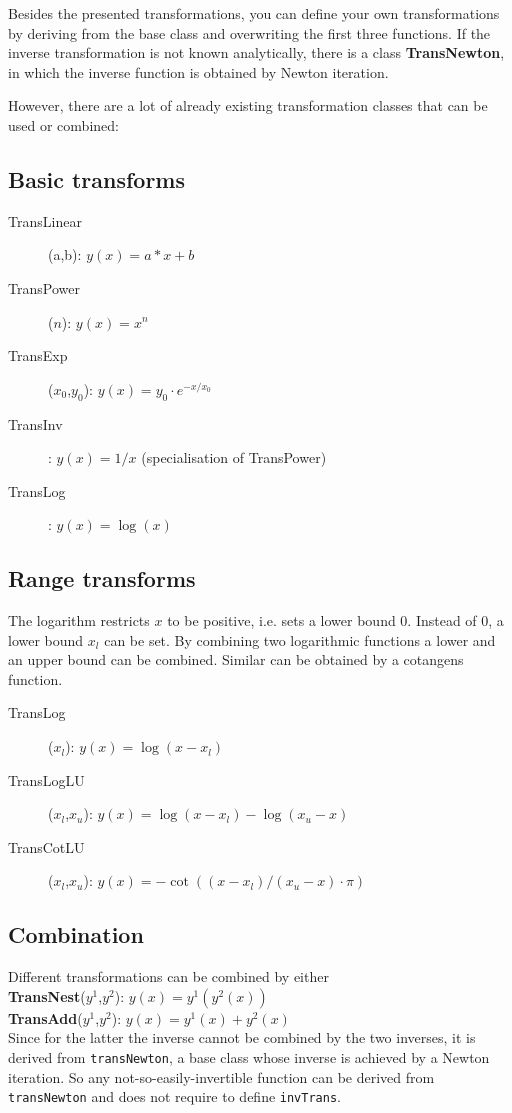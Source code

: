 Besides the presented transformations, you can define your own transformations by deriving from the base class and overwriting the first three functions.
If the inverse transformation is not known analytically, there is a class \textbf{TransNewton}, in which the inverse function is obtained by Newton iteration.

However, there are a lot of already existing transformation classes that can be used or combined:

\subsection*{Basic transforms}
\begin{description}
\item[TransLinear](a,b): $y(x)=a*x+b$
\item[TransPower]($n$): $y(x)=x^n$
\item[TransExp]($x_0$,$y_0$): $y(x)=y_0\cdot e^{-x/x_0}$
\item[TransInv]: $y(x)=1/x$ (specialisation of TransPower)
\item[TransLog]: $y(x)=\log(x)$
\end{description}

\subsection*{Range transforms}
The logarithm restricts $x$ to be positive, i.e. sets a lower bound 0.
Instead of 0, a lower bound $x_l$ can be set.
By combining two logarithmic functions a lower and an upper bound can be combined.
Similar can be obtained by a cotangens function.

\begin{description}
\item[TransLog]($x_l$): $y(x)=\log(x-x_l)$
\item[TransLogLU]($x_l$,$x_u$): $y(x)=\log(x-x_l)-\log(x_u-x)$
\item[TransCotLU]($x_l$,$x_u$): $y(x)=-\cot((x-x_l)/(x_u-x)\cdot\pi)$
\end{description}

\subsection*{Combination}
Different transformations can be combined by either\\
\textbf{TransNest}($y^1$,$y^2$): $y(x)=y^1(y^2(x))$\\
\textbf{TransAdd}($y^1$,$y^2$): $y(x)=y^1(x)+y^2(x)$\\
Since for the latter the inverse cannot be combined by the two inverses, it is derived from \lstinline|transNewton|, a base class whose inverse is achieved by a Newton iteration.
So any not-so-easily-invertible function can be derived from \lstinline|transNewton| and does not require to define \lstinline|invTrans|.

